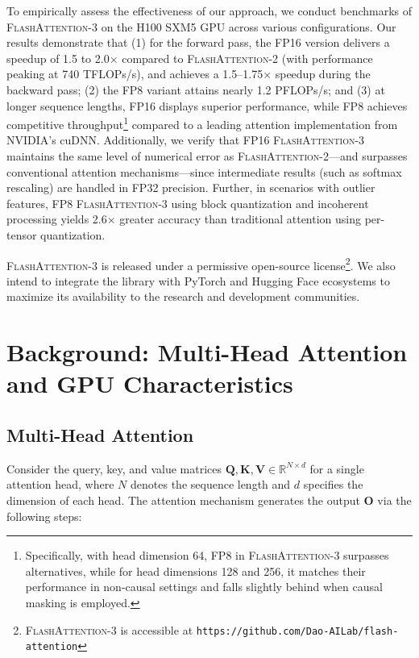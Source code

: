 To empirically assess the effectiveness of our approach, we conduct benchmarks of \textsc{FlashAttention-3} on the H100 SXM5 GPU across various configurations. Our results demonstrate that (1) for the forward pass, the FP16 version delivers a speedup of 1.5 to 2.0$\times$ compared to \textsc{FlashAttention-2} (with performance peaking at 740 TFLOPs/s), and achieves a 1.5–1.75$\times$ speedup during the backward pass; (2) the FP8 variant attains nearly 1.2 PFLOPs/s; and (3) at longer sequence lengths, FP16 displays superior performance, while FP8 achieves competitive throughput\footnote{Specifically, with head dimension 64, FP8 in \textsc{FlashAttention-3} surpasses alternatives, while for head dimensions 128 and 256, it matches their performance in non-causal settings and falls slightly behind when causal masking is employed.} compared to a leading attention implementation from NVIDIA's cuDNN. Additionally, we verify that FP16 \textsc{FlashAttention-3} maintains the same level of numerical error as \textsc{FlashAttention-2}—and surpasses conventional attention mechanisms—since intermediate results (such as softmax rescaling) are handled in FP32 precision. Further, in scenarios with outlier features, FP8 \textsc{FlashAttention-3} using block quantization and incoherent processing yields 2.6$\times$ greater accuracy than traditional attention using per-tensor quantization.

\textsc{FlashAttention-3} is released under a permissive open-source license\footnote{\textsc{FlashAttention-3} is accessible at \texttt{https://github.com/Dao-AILab/flash-attention}}. We also intend to integrate the library with PyTorch and Hugging Face ecosystems to maximize its availability to the research and development communities.

\section{Background: Multi-Head Attention and GPU Characteristics}
\label{sec:background}

\subsection{Multi-Head Attention}
\label{subsec:multi_head_attn}

Consider the query, key, and value matrices $\mathbf{Q}, \mathbf{K}, \mathbf{V} \in \mathbb{R}^{N \times d}$ for a single attention head, where $N$ denotes the sequence length and $d$ specifies the dimension of each head. The attention mechanism generates the output $\mathbf{O}$ via the following steps:

